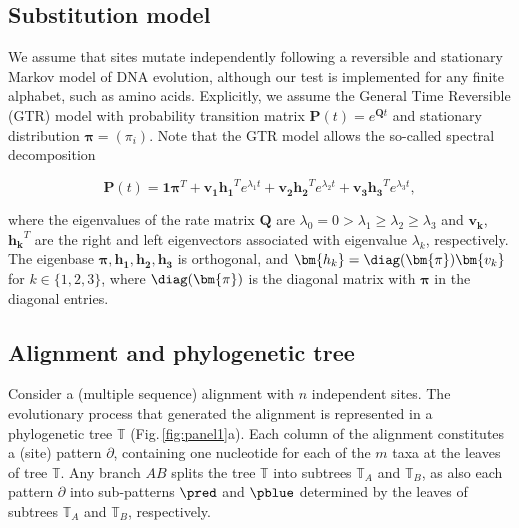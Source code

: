 
\subsection{Substitution model}
We assume that sites mutate independently following a reversible and stationary Markov model of DNA  evolution, although our test is implemented for any finite alphabet, such as amino acids. Explicitly, we assume the General Time Reversible (GTR) model   with probability transition matrix $\bm{P}(t) = e^{\bm{Q}t}$ and stationary distribution $\bm{\pi} = (\pi_i)$. Note that the GTR model allows the so-called spectral decomposition  

\begin{equation} \label{eq:decomposition}
    \bm{P}(t) = \bm{1}\bm{\pi}^T + \bm{v_1} \bm{h_1}^T e^{\lambda_1t} + \bm{v_2} \bm{h_2}^T e^{\lambda_2t} + \bm{v_3} \bm{h_3}^T e^{\lambda_3t},
\end{equation}
 
where the eigenvalues of the rate matrix $\bm{Q}$ are ${\lambda_0=0 > \lambda_1 \geq \lambda_2 \geq \lambda_3}$ and $\bm{v_k}$, $\bm{h_k}^T$ are the right and left eigenvectors associated with eigenvalue $\lambda_k$, respectively. The eigenbase $\bm{\pi}, \bm{h_1},\bm{h_2},\bm{h_3}$ is orthogonal, and $\bm{h_k} = \diag (\bm{\pi})\bm{v_k}$ for $k \in \{1,2,3\}$, where $\diag (\bm{\pi})$ is the diagonal matrix with $\bm{\pi}$ in the diagonal entries.


\subsection{Alignment and phylogenetic tree}

Consider a (multiple sequence) alignment with $n$ independent sites. The evolutionary process that generated the alignment is represented in a phylogenetic tree $\mathbb{T}$ (Fig.\,\ref{fig:panel1}a). Each column of the alignment constitutes a (site) pattern $\partial$, containing one nucleotide for each of the $m$ taxa at the leaves of tree $\mathbb{T}$. Any branch $AB$ splits the tree $\mathbb{T}$ into subtrees $\mathbb{T}_A$ and $\mathbb{T}_B$, as also each pattern $\partial$ into sub-patterns $\pred$ and $\pblue$ determined by the leaves of subtrees $\mathbb{T}_A$ and $\mathbb{T}_B$, respectively. 
 

